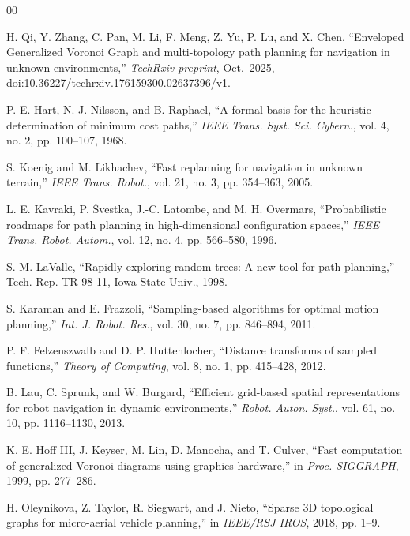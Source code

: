 \documentclass[conference]{IEEEtran}
\begin{document}
\begin{thebibliography}{00}

 H. Qi, Y. Zhang, C. Pan, M. Li, F. Meng, Z. Yu, P. Lu, and X. Chen, ``Enveloped Generalized Voronoi Graph and multi-topology path planning for navigation in unknown environments,'' \textit{TechRxiv preprint}, Oct.\ 2025, doi:10.36227/techrxiv.176159300.02637396/v1.

 P. E. Hart, N. J. Nilsson, and B. Raphael, ``A formal basis for the heuristic determination of minimum cost paths,'' \textit{IEEE Trans. Syst. Sci. Cybern.}, vol. 4, no. 2, pp. 100--107, 1968.

 S. Koenig and M. Likhachev, ``Fast replanning for navigation in unknown terrain,'' \textit{IEEE Trans. Robot.}, vol. 21, no. 3, pp. 354--363, 2005.

 L. E. Kavraki, P. \v{S}vestka, J.-C. Latombe, and M. H. Overmars, ``Probabilistic roadmaps for path planning in high-dimensional configuration spaces,'' \textit{IEEE Trans. Robot. Autom.}, vol. 12, no. 4, pp. 566--580, 1996.

 S. M. LaValle, ``Rapidly-exploring random trees: A new tool for path planning,'' Tech. Rep. TR 98-11, Iowa State Univ., 1998.

 S. Karaman and E. Frazzoli, ``Sampling-based algorithms for optimal motion planning,'' \textit{Int. J. Robot. Res.}, vol. 30, no. 7, pp. 846--894, 2011.

 P. F. Felzenszwalb and D. P. Huttenlocher, ``Distance transforms of sampled functions,'' \textit{Theory of Computing}, vol. 8, no. 1, pp. 415--428, 2012.

 B. Lau, C. Sprunk, and W. Burgard, ``Efficient grid-based spatial representations for robot navigation in dynamic environments,'' \textit{Robot. Auton. Syst.}, vol. 61, no. 10, pp. 1116--1130, 2013.

 K. E. Hoff III, J. Keyser, M. Lin, D. Manocha, and T. Culver, ``Fast computation of generalized Voronoi diagrams using graphics hardware,'' in \textit{Proc. SIGGRAPH}, 1999, pp. 277--286.

 H. Oleynikova, Z. Taylor, R. Siegwart, and J. Nieto, ``Sparse 3D topological graphs for micro-aerial vehicle planning,'' in \textit{IEEE/RSJ IROS}, 2018, pp. 1--9.


\end{thebibliography}
\end{document}
